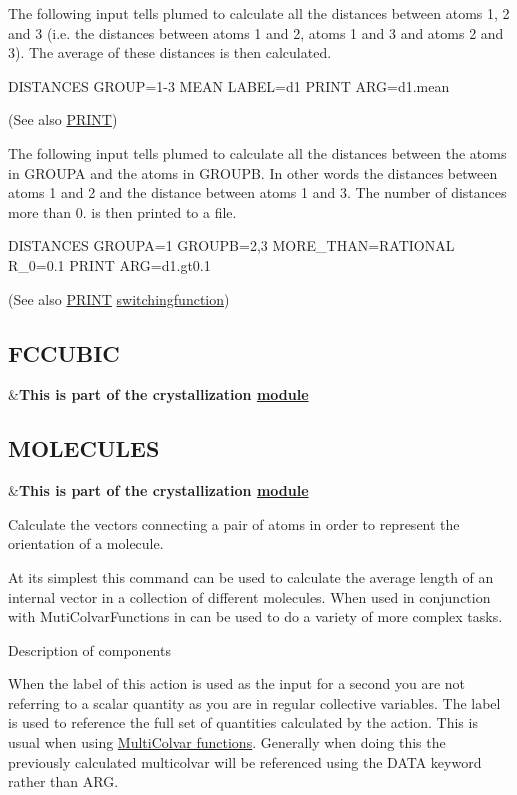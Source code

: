 The following input tells plumed to calculate all the distances between atoms 1, 2 and 3 (i.\+e. the distances between atoms 1 and 2, atoms 1 and 3 and atoms 2 and 3). The average of these distances is then calculated. \begin{DoxyVerb}DISTANCES GROUP=1-3 MEAN LABEL=d1
PRINT ARG=d1.mean
\end{DoxyVerb}
 (See also \hyperlink{PRINT}{P\+R\+I\+N\+T})

The following input tells plumed to calculate all the distances between the atoms in G\+R\+O\+U\+P\+A and the atoms in G\+R\+O\+U\+P\+B. In other words the distances between atoms 1 and 2 and the distance between atoms 1 and 3. The number of distances more than 0. is then printed to a file. \begin{DoxyVerb}DISTANCES GROUPA=1 GROUPB=2,3 MORE_THAN={RATIONAL R_0=0.1}
PRINT ARG=d1.gt0.1 
\end{DoxyVerb}
 (See also \hyperlink{PRINT}{P\+R\+I\+N\+T} \hyperlink{switchingfunction}{switchingfunction}) \hypertarget{FCCUBIC}{}\subsection{F\+C\+C\+U\+B\+I\+C}\label{FCCUBIC}
\begin{TabularC}{2}
\hline
&{\bfseries  This is part of the crystallization \hyperlink{mymodules}{module }}   \\
\end{TabularC}
\hypertarget{MOLECULES}{}\subsection{M\+O\+L\+E\+C\+U\+L\+E\+S}\label{MOLECULES}
\begin{TabularC}{2}
\hline
&{\bfseries  This is part of the crystallization \hyperlink{mymodules}{module }}   \\
\end{TabularC}
Calculate the vectors connecting a pair of atoms in order to represent the orientation of a molecule.

At its simplest this command can be used to calculate the average length of an internal vector in a collection of different molecules. When used in conjunction with Muti\+Colvar\+Functions in can be used to do a variety of more complex tasks.

\begin{DoxyParagraph}{Description of components}

\end{DoxyParagraph}
When the label of this action is used as the input for a second you are not referring to a scalar quantity as you are in regular collective variables. The label is used to reference the full set of quantities calculated by the action. This is usual when using \hyperlink{mcolv_multicolvarfunction}{Multi\+Colvar functions}. Generally when doing this the previously calculated multicolvar will be referenced using the D\+A\+T\+A keyword rather than A\+R\+G.

